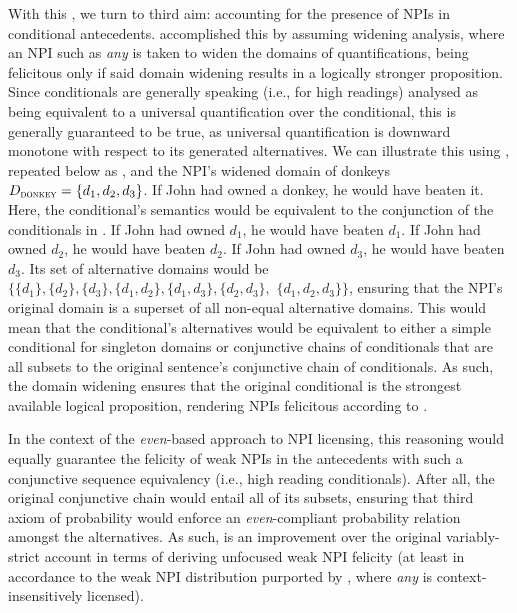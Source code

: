 With this , we turn to  third aim: accounting for the presence of NPIs in conditional antecedents. \textcite{vanRooij2006} accomplished this by assuming  widening analysis, where an NPI such as \textit{any} is taken to widen the domains of quantifications, being felicitous only if said domain widening results in a logically stronger proposition. Since  conditionals are generally speaking (i.e., for high readings) analysed as being equivalent to a universal quantification over the conditional, this is generally guaranteed to be true, as universal quantification is downward monotone with respect to its generated alternatives. We can illustrate this using , repeated below as , and the NPI's widened domain of donkeys $D_\text{\scshape donkey}=\{d_1,d_2,d_3\}$.
\ex
If John had owned a donkey, he would have beaten it.
\xe
Here, the conditional's semantics would be equivalent to the conjunction of the conditionals in .
\pex\label{ex:donkey-conjunction2}
\a If John had owned $d_1$, he would have beaten $d_1$.
\a If John had owned $d_2$, he would have beaten $d_2$.
\a If John had owned $d_3$, he would have beaten $d_3$.
\xe
Its set of alternative domains would be $\{\{d_1\},\{d_2\},\{d_3\},\{d_1,d_2\},\{d_1,d_3\},\{d_2,d_3\},$ $\{d_1,d_2,d_3\}\}$, ensuring that the NPI's original domain is a superset of all non-equal alternative domains. This would mean that the conditional's alternatives would be equivalent to either a simple conditional for singleton domains or conjunctive chains of conditionals that are all subsets to the original sentence's conjunctive chain of conditionals. As such, the domain widening ensures that the original conditional is the strongest available logical proposition, rendering NPIs felicitous according to \textcite{Kadmon1993}.

In the context of the \textit{even}-based approach to NPI licensing, this reasoning would equally guarantee the felicity of weak NPIs in the antecedents with such a conjunctive sequence equivalency (i.e., high reading conditionals). After all, the original conjunctive chain would entail all of its subsets, ensuring that  third axiom of probability would enforce an \textit{even}-compliant probability relation amongst the alternatives. As such, \textcite{vanRooij2006} is an improvement over the original variably-strict account in terms of deriving unfocused weak NPI felicity (at least in accordance to the weak NPI distribution purported by \textcite{Crnic2014-dogma}, where \textit{any} is context-insensitively licensed). 

